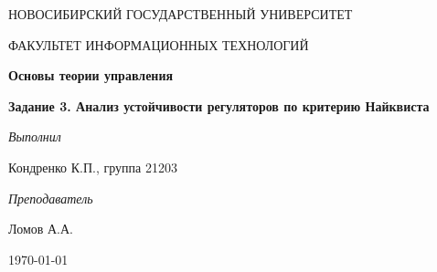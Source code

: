 \begin{titlepage}
	\centering
	{\LARGE \textsc{НОВОСИБИРСКИЙ ГОСУДАРСТВЕННЫЙ УНИВЕРСИТЕТ}\par}
	{\textsc{ФАКУЛЬТЕТ ИНФОРМАЦИОННЫХ ТЕХНОЛОГИЙ}\par}
	
	\vspace{3cm}
	
	{\huge\bfseries Основы теории управления\par}
	
	\vspace{1cm}
	
	{\Large\bfseries Задание 3. Анализ устойчивости регуляторов по критерию Найквиста\par}
	
	\vspace{10cm}
	
	\begin{flushright}
		{\large\textit{Выполнил}}
		
		Кондренко К.П., группа 21203
		
		\bigskip
		
		{\large\textit{Преподаватель}}
		
		Ломов А.А.
	\end{flushright}
	
	\vfill
	
	{\large \today\par}
\end{titlepage}
